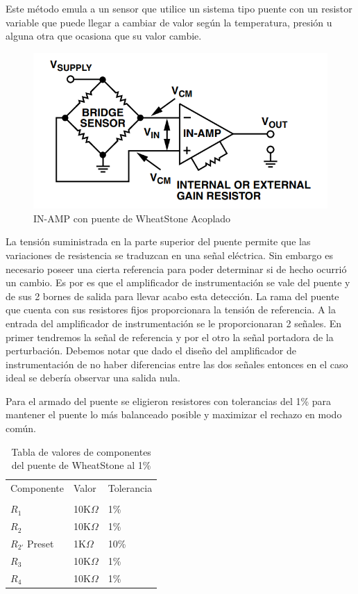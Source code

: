 \documentclass[a4paper]{article}
\begin{document}
Este método emula a un sensor que utilice un sistema tipo puente con un resistor variable que puede llegar a cambiar de valor según la temperatura, presión u alguna otra que ocasiona que su valor cambie.

\begin{figure}[H]
	\centering
	\includegraphics[height=0.3\textheight]{../ImagenesVarias/wheatstoneInAmp.png}
	\caption{IN-AMP con puente de WheatStone Acoplado}
\end{figure}

La tensión suministrada en la parte superior del puente permite que las variaciones de resistencia se traduzcan en una señal eléctrica.
Sin embargo es necesario poseer una cierta referencia para poder determinar si de hecho ocurrió un cambio. Es por es que el amplificador de instrumentación se vale del puente y de sus 2 bornes de salida para llevar acabo esta detección. La rama del puente que cuenta con sus resistores fijos proporcionara la tensión de referencia.
A la entrada del amplificador de instrumentación se le proporcionaran 2 señales. En primer tendremos la señal de referencia y por el otro la señal portadora de la perturbación.
Debemos notar que dado el diseño del amplificador de instrumentación de no haber diferencias entre las dos señales entonces en el caso ideal se debería observar una salida nula. 

Para el armado del puente se eligieron resistores con tolerancias del 1\% para mantener el puente lo más balanceado posible y maximizar el rechazo en modo común.
\begin{table}[H]
	\centering
	\begin{tabular}{lll}
		Componente  		& Valor        	& Tolerancia \\
		\\
		$R_1$       		& 10K$\Omega$   & 1\%        \\
		$R_2$       		& 10K$\Omega$ 	& 1\%        \\
		$R_{2'}$ Preset      & 1K$\Omega$ 	& 10\%        \\
		$R_3$  				& 10K$\Omega$   & 1\%        \\
		$R_4$ 				& 10K$\Omega$   & 1\%		\\
	\end{tabular}
	\caption{Tabla de valores de componentes del puente de WheatStone al 1\%}
\end{table}
\end{document}
